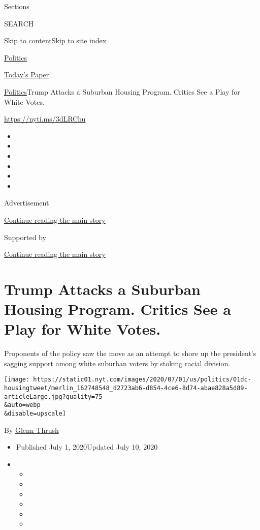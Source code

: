 Sections

SEARCH

\protect\hyperlink{site-content}{Skip to
content}\protect\hyperlink{site-index}{Skip to site index}

\href{https://www.nytimes.com/section/politics}{Politics}

\href{https://myaccount.nytimes.com/auth/login?response_type=cookie\&client_id=vi}{}

\href{https://www.nytimes.com/section/todayspaper}{Today's Paper}

\href{/section/politics}{Politics}\textbar{}Trump Attacks a Suburban
Housing Program. Critics See a Play for White Votes.

\url{https://nyti.ms/3dLRChu}

\begin{itemize}
\item
\item
\item
\item
\item
\item
\end{itemize}

Advertisement

\protect\hyperlink{after-top}{Continue reading the main story}

Supported by

\protect\hyperlink{after-sponsor}{Continue reading the main story}

\hypertarget{trump-attacks-a-suburban-housing-program-critics-see-a-play-for-white-votes}{%
\section{Trump Attacks a Suburban Housing Program. Critics See a Play
for White
Votes.}\label{trump-attacks-a-suburban-housing-program-critics-see-a-play-for-white-votes}}

Proponents of the policy saw the move as an attempt to shore up the
president's sagging support among white suburban voters by stoking
racial division.

\texttt{[image: https://static01.nyt.com/images/2020/07/01/us/politics/01dc-housingtweet/merlin\_162748548\_d2723ab6-d854-4ce6-8d74-abae828a5d89-articleLarge.jpg?quality=75\\\&auto=webp\\\&disable=upscale]}

By \href{https://www.nytimes.com/by/glenn-thrush}{Glenn Thrush}

\begin{itemize}
\item
  Published July 1, 2020Updated July 10, 2020
\item
  \begin{itemize}
  \item
  \item
  \item
  \item
  \item
  \item
  \end{itemize}
\end{itemize}

